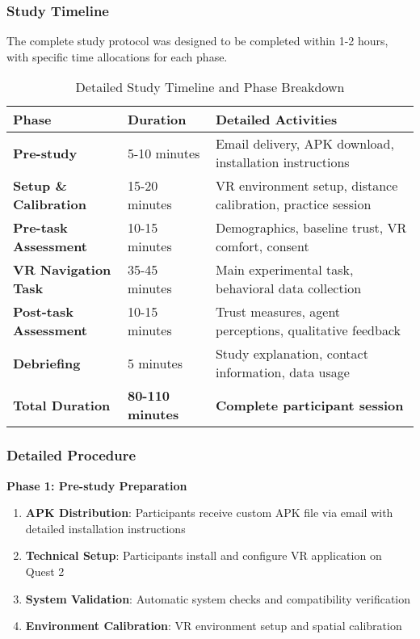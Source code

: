 \documentclass[12pt]{article}
\begin{document}
\subsubsection{Study Timeline}

The complete study protocol was designed to be completed within 1-2 hours, with specific time allocations for each phase.

\begin{table}[h]
\centering
\caption{Detailed Study Timeline and Phase Breakdown}
\begin{tabular}{@{}lll@{}}
\toprule
\textbf{Phase} & \textbf{Duration} & \textbf{Detailed Activities} \\
\midrule
\textbf{Pre-study} & 5-10 minutes & Email delivery, APK download, installation instructions \\
\textbf{Setup \& Calibration} & 15-20 minutes & VR environment setup, distance calibration, practice session \\
\textbf{Pre-task Assessment} & 10-15 minutes & Demographics, baseline trust, VR comfort, consent \\
\textbf{VR Navigation Task} & 35-45 minutes & Main experimental task, behavioral data collection \\
\textbf{Post-task Assessment} & 10-15 minutes & Trust measures, agent perceptions, qualitative feedback \\
\textbf{Debriefing} & 5 minutes & Study explanation, contact information, data usage \\
\midrule
\textbf{Total Duration} & \textbf{80-110 minutes} & \textbf{Complete participant session} \\
\bottomrule
\end{tabular}
\end{table}

\subsubsection{Detailed Procedure}

\textbf{Phase 1: Pre-study Preparation}
\begin{enumerate}
    \item \textbf{APK Distribution}: Participants receive custom APK file via email with detailed installation instructions
    \item \textbf{Technical Setup}: Participants install and configure VR application on Quest 2
    \item \textbf{System Validation}: Automatic system checks and compatibility verification
    \item \textbf{Environment Calibration}: VR environment setup and spatial calibration
\end{enumerate}
\end{document}
